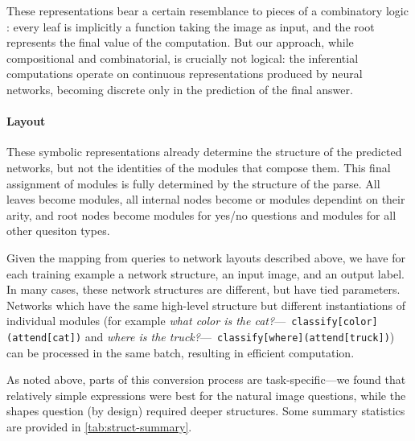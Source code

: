 These representations bear a certain resemblance to pieces of a combinatory
logic \cite{Liang13DCS}: every leaf is implicitly a function taking the image as
input, and the root represents the final value of the computation.  But our
approach, while compositional and combinatorial, is crucially not logical: the
inferential computations operate on continuous representations produced by
neural networks, becoming discrete only in the prediction of the final answer.

\paragraph{Layout}
These symbolic representations already determine the structure of the predicted
networks, but not the identities of the modules that compose them. This final
assignment of modules is fully determined by the structure of the parse. All
leaves become  modules, all internal nodes become  or
 modules dependint on their arity, and root nodes become
 modules for yes/no questions and  modules for all
other quesiton types.

Given the mapping from queries to network layouts described above, we have for
each training example a network structure, an input image, and an output label.
In many cases, these network structures are different, but have tied parameters.
Networks which have the same high-level structure but different instantiations
of individual modules (for example \emph{what color is the cat?}---{\small\tt
classify[color](attend[cat])} and \emph{where is the truck?}---{\small\tt
classify[where](attend[truck])}) can be processed in the same batch, resulting
in efficient computation.

As noted above, parts of this conversion process are task-specific---we found
that relatively simple expressions were best for the natural image questions,
while the shapes question (by design) required deeper structures. Some summary
statistics are provided in \autoref{tab:struct-summary}.

